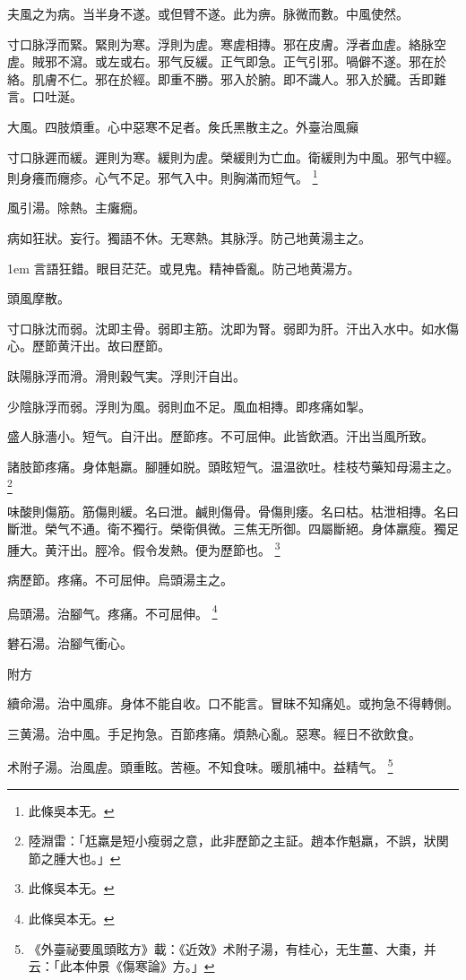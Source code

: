 夫風之为病。当半身不遂。或但臂不遂。此为痹。脉微而數。中風使然。

寸口脉浮而緊。緊則为寒。浮則为虗。寒虗相摶。邪在皮膚。浮者血虗。絡脉空虗。賊邪不瀉。或左或右。邪气反緩。正气即急。正气引邪。喎僻不遂。邪在於絡。肌膚不仁。邪在於經。即重不勝。邪入於腑。即不識人。邪入於臓。舌即難言。口吐涎。

大風。四肢煩重。心中惡寒不足者。矦氏黑散主之。{\scriptsize 外臺治風癲}

寸口脉遲而緩。遲則为寒。緩則为虗。榮緩則为亡血。衛緩則为中風。邪气中經。則身癢而癮疹。心气不足。邪气入中。則胸滿而短气。
	\footnote{此條吳本无。}

風引湯。除熱{\khaaitp 。主}癱癇。

病如狂狀。妄行。獨語不休。无寒熱。其脉浮。防己地黄湯主之。

\hangindent 1em
言語狂錯。眼目茫茫。或見鬼。精神昏亂。防己地黄湯方。{\qianjin}

頭風摩散。

寸口脉沈而弱。沈即主骨。弱即主筋。沈即为腎。弱即为肝。汗出入水中。如水傷心。歷節黄汗出。故曰歷節。

趺陽脉浮而滑。滑則穀气実。浮則汗自出。

少陰脉浮而弱。浮則为風。弱則血不足。風血相摶。即疼痛如掣。

盛人脉濇小。短气。自汗出。歷節疼。不可屈伸。此皆飲酒。汗出当風所致。

諸肢節疼痛。身体魁羸。腳腫如脱。頭眩短气。温温欲吐。桂枝芍藥知母湯主之。
	\footnote{
		陸淵雷：「尪羸是短小瘦弱之意，此非歷節之主証。趙本作魁羸，不誤，狀関節之腫大也。」
	}

味酸則傷筋。筋傷則緩。名曰泄。鹹則傷骨。骨傷則痿。名曰枯。枯泄相摶。名曰斷泄。榮气不通。衛不獨行。榮衛俱微。三焦无所御。四屬斷絕。身体羸瘦。獨足腫大。黄汗出。脛冷。假令发熱。便为歷節也。
	\footnote{此條吳本无。}

病歷節。疼痛。不可屈伸。烏頭湯主之。

烏頭湯。治腳气。疼痛。不可屈伸。
	\footnote{此條吳本无。}

礬石湯。治腳气衝心。

附方

續命湯。治中風痱。身体不能自收。口不能言。冒昧不知痛処。或拘急不得轉側。

三黄湯。治中風。手足拘急。百節疼痛。煩熱心亂。惡寒。經日不欲飲食。

术附子湯。治風虗。頭重眩。苦極。不知食味。暖肌補中。益精气。
	\footnote{
		《外臺祕要風頭眩方》載：《近效》术附子湯，有桂心，无生薑、大棗，并云：「此本仲景《傷寒論》方。」
	}

